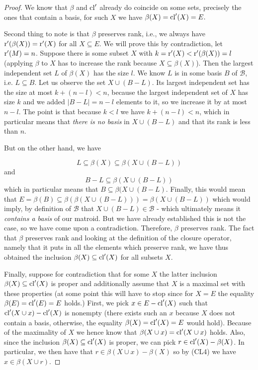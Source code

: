 \begin{proof}
We know that $\beta$ and $\mathrm{cl}'$ already do coincide on some sets, precisely the ones that contain a basis, for such $X$ we have $\beta(X) = \mathrm{cl}'(X) = E.$

Second thing to note is that $\beta$ preserves rank, i.e., we always have $\operatorname{r}'(\beta(X)) = \operatorname{r}'(X)$ for all $X\subseteq E$. We will prove this by contradiction, let $\operatorname{r}'(M) = n$. Suppose there is some subset $X$ with $k  = \operatorname{r}'(X)<\operatorname{r}'(\beta(X)) = l$ (applying $\beta$ to $X$ has to increase the rank because $X \subseteq \beta(X)$). Then the largest independent set $L$ of $\beta(X)$ has the size $l$. We know $L$ is in some basis $B$ of $\mathcal{B}$, i.e. $L \subseteq B$. Let us observe the set $X \cup (B-L)$.  Its largest independent set has the size at most $k + (n-l)<n$, because the largest independent set of $X$ has size $k$ and we added $|B-L| = n - l$ elements to it, so we increase it by at most $n-l$. The point is that because $k<l$ we have $k + (n-l)<n$, which in particular means that \textit{there is no basis} in $X \cup (B-L)$ and that its rank is less than $n.$


But on the other hand, we have

$$L \subseteq \beta(X) \subseteq \beta(X \cup (B-L))$$ and $$B-L \subseteq \beta(X \cup (B-L))$$ which in particular means that $B \subseteq \beta(X \cup (B-L)$. Finally, this would mean that  
$E = \beta(B)\subseteq \beta(\beta(X \cup (B-L))) = \beta(X \cup (B-L))$ which would imply, by definition of $\mathcal{B}$ that $X \cup (B-L)
\in \mathcal{B}$ - which ultimately means it \textit{contains a basis} of our matroid. But we have already established this is not the case, so we have come upon a contradiction. Therefore, $\beta$ preserves rank.
The fact that $\beta$ preserves rank and looking at the definition of the closure operator, namely that it puts in all the elements which preserve rank, we have thus obtained the inclusion $\beta(X) \subseteq \mathrm{cl}'(X)$ for all subsets $X.$

Finally, suppose for contradiction that for some $X$ the latter inclusion $\beta(X) \subseteq \mathrm{cl}'(X)$ is proper and additionally assume that $X$ is a maximal set with these properties (at some point this will have to stop since for $X =E$ the equality $\beta(E) = \mathrm{cl}'(E) = E$ holds.) First, we pick $x \in E - \mathrm{cl}'(X)$ such that $\mathrm{cl}'(X\cup x) - \mathrm{cl}'(X)$ is nonempty (there exists such an $x$ because $X$ does not contain a basis, otherwise, the equality $\beta(X) = \mathrm{cl}'(X) = E$ would hold).
Because of the maximality of $X$ we hence know that $\beta(X\cup x) = \mathrm{cl}'(X \cup x)$ holds. Also, since the inclusion $\beta(X) \subseteq \mathrm{cl}'(X)$ is proper, we can pick $r \in \mathrm{cl}'(X) - \beta(X)$. In particular, we then have that $r \in \beta(X\cup x) - \beta(X)$ so by (CL4) we have $x \in \beta(X\cup r)$.


\end{proof}
